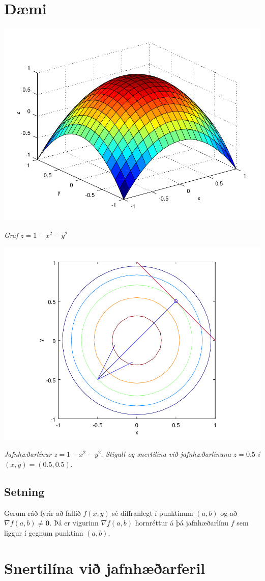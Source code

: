 \documentclass[a4paper,10pt,icelandic]{sphinxmanual}
\begin{document}
\section{Dæmi}
\label{Kafli2:id44}
{\hfill\includegraphics[width=0.600\linewidth]{gradfurf.png}\hfill}

\emph{Graf} \(z=1-x^2-y^2\)

{\hfill\includegraphics[width=0.600\linewidth]{gradient.png}\hfill}

\emph{Jafnhæðarlínur} \(z=1-x^2-y^2\). \emph{Stigull og snertilína við jafnhæðarlínuna} \(z=0.5\) \emph{í} \((x,y) = (0.5,0.5)\).


\subsection{Setning}
\label{Kafli2:id45}
Gerum ráð fyrir að fallið \(f(x,y)\) sé diffranlegt í punktinum
\((a,b)\) og að \(\nabla f(a,b) \neq \mathbf{0}\). Þá er
vigurinn \(\nabla f(a,b)\) hornréttur á þá jafnhæðarlínu \(f\)
sem liggur í gegnum punktinn \((a,b)\).


\section{Snertilína við jafnhæðarferil}
\label{Kafli2:snertilina-vi-jafnhaearferil}\label{Kafli2:index-22}
\end{document}

